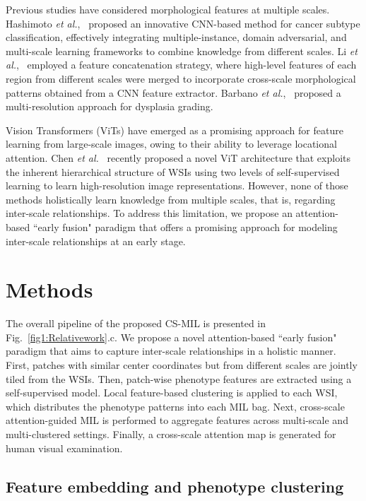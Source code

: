 \documentclass[times,twocolumn,final]{elsarticle}
\begin{document}
Previous studies have considered morphological features at multiple scales. Hashimoto \textit{et al.},~\citep{Hashimoto_2020_CVPR} proposed an innovative CNN-based method for cancer subtype classification, effectively integrating multiple-instance, domain adversarial, and multi-scale learning frameworks to combine knowledge from different scales. Li \textit{et al.},~\citep{Li_2021_CVPR} employed a feature concatenation strategy, where high-level features of each region from different scales were merged to incorporate cross-scale morphological patterns obtained from a CNN feature extractor. Barbano \textit{et al.},~\citep{barbano2021unitopatho} proposed a multi-resolution approach for dysplasia grading.

Vision Transformers (ViTs) have emerged as a promising approach for feature learning from large-scale images, owing to their ability to leverage locational attention. Chen \textit{et al.}~\citep{chen2022scaling} recently proposed a novel ViT architecture that exploits the inherent hierarchical structure of WSIs using two levels of self-supervised learning to learn high-resolution image representations. However, none of those methods holistically learn knowledge from multiple scales, that is, regarding inter-scale relationships. To address this limitation, we propose an attention-based ``early fusion" paradigm that offers a promising approach for modeling inter-scale relationships at an early stage.


\section{Methods}
The overall pipeline of the proposed CS-MIL is presented in Fig.~\ref{fig1:Relativework}.c. We propose a novel attention-based ``early fusion" paradigm that aims to capture inter-scale relationships in a holistic manner. First, patches with similar center coordinates but from different scales are jointly tiled from the WSIs. Then, patch-wise phenotype features are extracted using a self-supervised model. Local feature-based clustering is applied to each WSI, which distributes the phenotype patterns into each MIL bag. Next, cross-scale attention-guided MIL is performed to aggregate features across multi-scale and multi-clustered settings. Finally, a cross-scale attention map is generated for human visual examination.


\subsection{Feature embedding and phenotype clustering}
\end{document}
